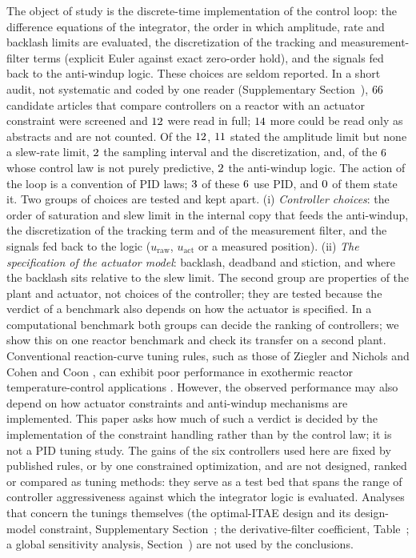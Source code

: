 The object of study is the discrete-time implementation of the control loop: the difference equations of the integrator, the order in which amplitude, rate and backlash limits are evaluated, the discretization of the tracking and measurement-filter terms (explicit Euler against exact zero-order hold), and the signals fed back to the anti-windup logic. These choices are seldom reported. In a short audit, not systematic and coded by one reader (Supplementary Section~), $66$ candidate articles that compare controllers on a reactor with an actuator constraint were screened and $12$ were read in full; $14$ more could be read only as abstracts and are not counted. Of the $12$, $11$ stated the amplitude limit but none a slew-rate limit, $2$ the sampling interval and the discretization, and, of the $6$ whose control law is not purely predictive, $2$ the anti-windup logic. The action of the loop is a convention of PID laws; $3$ of these $6$ use PID, and $0$ of them state it. Two groups of choices are tested and kept apart. (i) \emph{Controller choices}: the order of saturation and slew limit in the internal copy that feeds the anti-windup, the discretization of the tracking term and of the measurement filter, and the signals fed back to the logic ($u_{\text{raw}}$, $u_{\text{act}}$ or a measured position). (ii) \emph{The specification of the actuator model}: backlash, deadband and stiction, and where the backlash sits relative to the slew limit. The second group are properties of the plant and actuator, not choices of the controller; they are tested because the verdict of a benchmark also depends on how the actuator is specified. In a computational benchmark both groups can decide the ranking of controllers; we show this on one reactor benchmark and check its transfer on a second plant. Conventional reaction-curve tuning rules, such as those
of Ziegler and Nichols \cite{ziegler1942optimum}
and Cohen and Coon \cite{cohen1953theoretical},
can exhibit poor performance in exothermic reactor
temperature-control applications
\cite{visioli2006practical, luyben2007chemical}.
However, the observed performance may also depend
on how actuator constraints and anti-windup mechanisms
are implemented. This paper asks how much of such a verdict is decided by the implementation of the constraint handling rather than by the control law; it is not a PID tuning study. The gains of the six controllers used here are fixed by published rules, or by one constrained optimization, and are not designed, ranked or compared as tuning methods: they serve as a test bed that spans the range of controller aggressiveness against which the integrator logic is evaluated. Analyses that concern the tunings themselves (the optimal-ITAE design and its design-model constraint, Supplementary Section~; the derivative-filter coefficient, Table~; a global sensitivity analysis, Section~) are not used by the conclusions.

